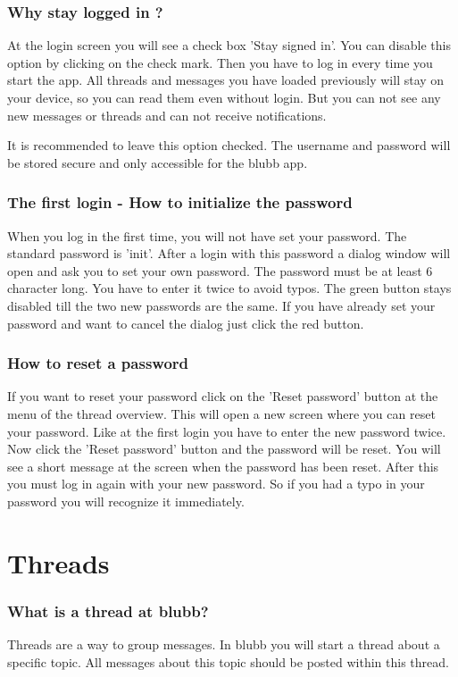 \documentclass[12pt,a4paper,oneside]{report}
\newcommand{\appname}{blubb}
\begin{document}
\subsubsection{Why stay logged in ?}
At the login screen you will see a check box 'Stay signed in'. You can disable this option by clicking on the check mark. Then you have to log in every time you start the app. All threads and messages you have loaded previously will stay on your device, so you can read them even without login. But you can not see any new messages or threads and can not receive notifications. 

It is recommended to leave this option checked. The username and password will be stored secure and only accessible for the \appname{} app.

\subsubsection{The first login - How to initialize the password} \label{subsubsec:init}
When you log in the first time, you will not have set your password. The standard password is 'init'. After a login with this password a dialog window will open and ask you to set your own password. The password must be at least 6 character long. You have to enter it twice to avoid typos. The green button stays disabled till the two new passwords are the same. If you have already set your password and want to cancel the dialog just click the red button.

\subsubsection{How to reset a password}
If you want to reset your password click on the 'Reset password' button at the menu of the thread overview. This will open a new screen where you can reset your password. Like at the first login you have to enter the new password twice. Now click the 'Reset password' button and the password will be reset. You will see a short message at the screen when the password has been reset. After this you must log in again with your new password. So if you had a typo in your password you will recognize it immediately.


\section{Threads}
\subsubsection{What is a thread at \appname{}?}
Threads are a way to group messages. In \appname{} you will start a thread about a specific topic. All messages about this topic should be posted within this thread. 
\end{document}
